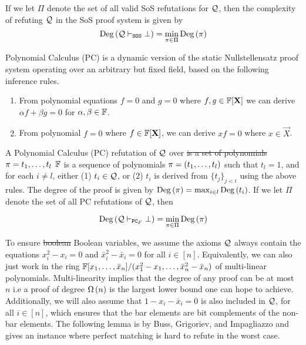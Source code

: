 \documentclass[11pt]{article}
\providecommand{\DIFadd}[1]{\textcolor{shin-ryoku}{#1}}%
\providecommand{\DIFdel}[1]{\textcolor{verylightgray}{\sout{#1}}}                      %
\providecommand{\DIFaddbegin}{} %
\providecommand{\DIFaddend}{} %
\providecommand{\DIFdelbegin}{} %
\providecommand{\DIFdelend}{} %
\begin{document}
\DIFdelend \begin{definition}
If we let $\Pi$ denote the set of all valid SoS refutations for $\mathcal{Q}$, then the complexity of refuting $\mathcal{Q}$ in the SoS proof system is given by 
\[ \text{Deg}\left(\mathcal{Q} \vdash_{\texttt{SOS}} \bot\right) = \min_{\pi \in \Pi}\text{Deg}\left(\pi\right)\]

\end{definition}

Polynomial Calculus (PC) is a dynamic version of the static Nullstellensatz proof system \citep[Section 1.3]{fleming2019semialgebraic} \DIFaddbegin \DIFadd{operating over an arbitrary but fixed field, }\DIFaddend based on the following inference rules.
\begin{enumerate}
	\item From polynomial equations $f=0$ and $g=0$ where $f,g \in \mathbb{F}[\mathbf{X}]$ we can derive $\alpha f + \beta g = 0$ for $\alpha, \beta \in \mathbb{F}$.
	\item From polynomial $f=0$ where $f \in \mathbb{F}[\mathbf{X}]$, we can derive $xf=0$ where $x \in \vec{X}$.
\end{enumerate}

\begin{definition}\label{def:poly-calc-refutations}
A Polynomial Calculus (PC) refutation of $\mathcal{Q}$ over \DIFdelbegin \DIFdel{is a set of polynomials $\pi = t_1, \dots, t_l$	}\DIFdelend \DIFaddbegin \DIFadd{$\mathbb{F}$ is a sequence of polynomials $\pi = (t_1, \dots, t_l)$	}\DIFaddend such that $t_l = 1$, and for each $i \neq l$, either (1) $t_i \in \mathcal{Q}$, or (2) $t_i$ is derived from $\{t_j\}_{j < i}$ using the above rules.
The degree of the proof is given by $\text{Deg}\left(\pi\right) = \max_{i \in l}\text{Deg}\left(t_i\right)$. If we let $\Pi$ denote the set of all PC refutations of $\mathcal{Q}$, then

\[ \text{Deg}\left(\mathcal{Q} \vdash_{\texttt{PC}_F} \bot\right) = \min_{\pi \in \Pi}\text{Deg}\left(\pi\right)\]
\end{definition}

To ensure \DIFdelbegin \DIFdel{boolean }\DIFdelend \DIFaddbegin \DIFadd{Boolean }\DIFaddend variables, we assume the axioms $\mathcal{Q}$ always contain the equations $x_i^2 - x_i=0$ and $\bar{x}^2_i - \bar{x}_i = 0$ for all $i \in [n]$. 
Equivalently, we can also just work in the ring $\mathbb{F}[x_1, \dots, \bar{x}_n]/(x_1^2 - x_1, \dots, \bar{x}_n^2 - \bar{x}_n)$ of multi-linear polynomials.
Multi-linearity implies that the degree of any proof can be at most $n$ i.e a proof of degree $\Omega\left(n\right)$ is the largest lower bound one can hope to achieve.
Additionally, we will also assume that $1 - x_i - \bar{x}_i=0$ is also included in $\mathcal{Q}$, for all $i \in [n]$, which ensures that the bar elements are bit complements of the non-bar elements.
The following lemma is by Buss, Grigoriev, and Impagliazzo \cite{buss1999linear} and gives an instance where perfect matching is hard to refute in the worst case. 
\end{document}
